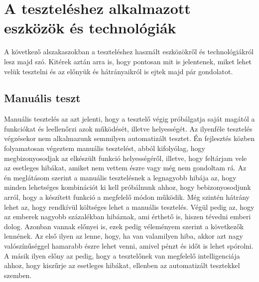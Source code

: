 \documentclass[]{thesis-ekf}
\theoremstyle{definition}
\theoremstyle{remark}
\begin{document}
	\section{A teszteléshez alkalmazott eszközök és technológiák}
		A következő alszakaszokban a teszteléshez használt eszközökről és technológiákról lesz majd szó. Kitérek aztán arra is, hogy pontosan mit is jelentenek, miket lehet velük tesztelni és az előnyük és hátrányaikról is ejtek majd pár gondolatot.
	\subsection{Manuális teszt}
		Manuális tesztelés az azt jelenti, hogy a tesztelő végig próbálgatja saját magától a funkciókat és leellenőrzi azok működését, illetve helyességét. Az ilyenféle tesztelés végzésekor nem alkalmazunk semmilyen automatizált tesztet. Én fejlesztés közben folyamatosan végeztem manuális tesztelést, abból kifolyólag, hogy megbizonyosodjak az elkészült funkció helyességéről, illetve, hogy feltárjam vele az esetleges hibákat, amiket nem vettem észre vagy még nem gondoltam rá. Az én meglátásom szerint a manuális tesztelésnek a legnagyobb hibája az, hogy minden lehetséges kombinációt ki kell próbálnunk ahhoz, hogy bebizonyosodjunk arról, hogy a készített funkció a megfelelő módon működik. Még szintén hátrány lehet az, hogy rendkívül költséges lehet a manuális tesztelés. Végül pedig az, hogy az emberek nagyobb százalékban hibáznak, ami érthető is, hiszen tévedni emberi dolog. Azonban vannak előnyei is, ezek pedig véleményem szerint a következők lennének. Az első ilyen az lenne, hogy, ha van valamilyen hiba, akkor azt nagy valószínűséggel hamarabb észre lehet venni, amivel pénzt és időt is lehet spórolni. A másik ilyen előny az pedig, hogy a tesztelőnek van megfelelő intelligenciája ahhoz, hogy kiszűrje az esetleges hibákat, ellenben az automatizált tesztekkel szemben. 
		
\end{document}
